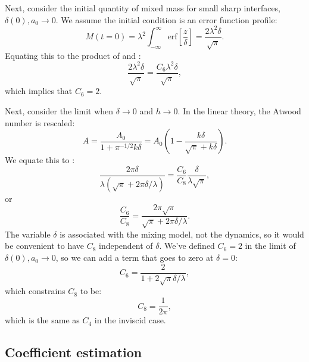 Next, consider the initial quantity of mixed mass for small sharp interfaces, $\delta(0), a_0 \rightarrow 0$.
We assume the initial condition is an error function profile:
\begin{equation}
M(t=0) = \lambda^2 \int_{-\infty}^{\infty} \text{erf}\left[\frac{z}{\delta}\right] = \frac{2\lambda^2 \delta}{\sqrt{\pi}}.
\end{equation}
Equating this to the product of  and :
\begin{equation}
\frac{2 \lambda^2 \delta}{\sqrt{\pi}}= \frac{C_6 \lambda^2 \delta}{\sqrt{\pi}},
\end{equation}
which implies that $C_6 = 2$.

Next, consider the limit when $\delta \rightarrow 0 $ and $h \rightarrow 0$.
In the linear theory, the Atwood number is rescaled:
\begin{equation}
A = \frac{A_0}{1 + \pi^{-1/2} k \delta} = A_0 \left(1 - \frac{k \delta}{\sqrt{\pi} + k \delta}\right).
\end{equation}
We equate this to :
\begin{equation}
\frac{2 \pi \delta}{\lambda (\sqrt{\pi} + 2 \pi \delta / \lambda)} = \frac{C_6 }{C_8}\frac{\delta}{\lambda \sqrt{\pi} },
\end{equation}
or
\begin{equation}
\frac{C_6}{C_8} = \frac{2 \pi \sqrt{\pi}}{\sqrt{\pi} + 2 \pi \delta / \lambda}.
\end{equation}
The variable $\delta$ is associated with the mixing model, not the dynamics, so it would be convenient to have $C_8$ independent of $\delta$.
We've defined $C_6 = 2$ in the limit of $\delta(0), a_0 \rightarrow 0$, so we can add a term that goes to zero at $\delta = 0$:
\begin{equation}
C_6 = \frac{2}{1 + 2 \sqrt{\pi} \delta / \lambda},
\end{equation}
which constrains $C_8$ to be:
\begin{equation}
C_8 = \frac{1}{2\pi},
\end{equation}
which is the same as $C_4$ in the inviscid case.

\subsection{Coefficient estimation}

